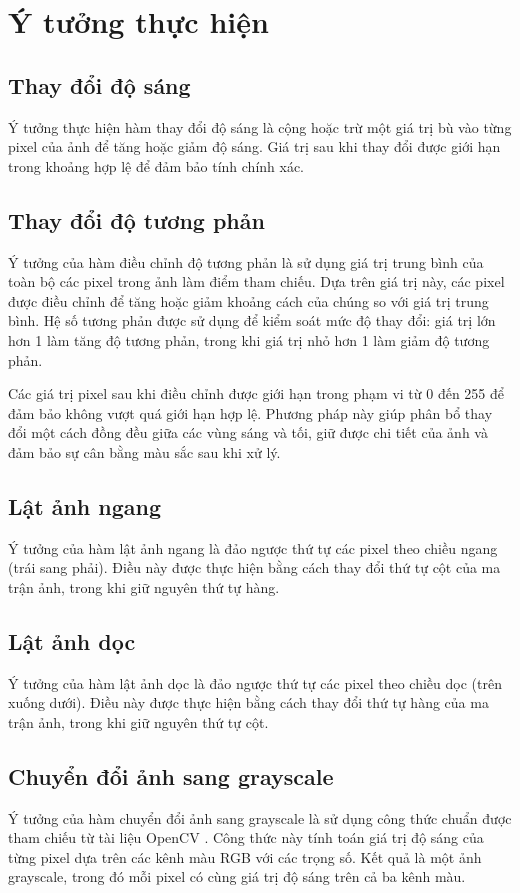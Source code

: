 \section{Ý tưởng thực hiện}
\subsection{Thay đổi độ sáng}
Ý tưởng thực hiện hàm thay đổi độ sáng là cộng hoặc trừ một giá trị bù vào từng pixel của ảnh để tăng hoặc giảm độ sáng. Giá trị sau khi thay đổi được giới hạn trong khoảng hợp lệ để đảm bảo tính chính xác.

\subsection{Thay đổi độ tương phản}
Ý tưởng của hàm điều chỉnh độ tương phản là sử dụng giá trị trung bình của toàn bộ các pixel trong ảnh làm điểm tham chiếu. Dựa trên giá trị này, các pixel được điều chỉnh để tăng hoặc giảm khoảng cách của chúng so với giá trị trung bình. Hệ số tương phản được sử dụng để kiểm soát mức độ thay đổi: giá trị lớn hơn 1 làm tăng độ tương phản, trong khi giá trị nhỏ hơn 1 làm giảm độ tương phản.

Các giá trị pixel sau khi điều chỉnh được giới hạn trong phạm vi từ 0 đến 255 để đảm bảo không vượt quá giới hạn hợp lệ. Phương pháp này giúp phân bổ thay đổi một cách đồng đều giữa các vùng sáng và tối, giữ được chi tiết của ảnh và đảm bảo sự cân bằng màu sắc sau khi xử lý.

\subsection{Lật ảnh ngang}
Ý tưởng của hàm lật ảnh ngang là đảo ngược thứ tự các pixel theo chiều ngang (trái sang phải). Điều này được thực hiện bằng cách thay đổi thứ tự cột của ma trận ảnh, trong khi giữ nguyên thứ tự hàng.

\subsection{Lật ảnh dọc}
Ý tưởng của hàm lật ảnh dọc là đảo ngược thứ tự các pixel theo chiều dọc (trên xuống dưới). Điều này được thực hiện bằng cách thay đổi thứ tự hàng của ma trận ảnh, trong khi giữ nguyên thứ tự cột.

\subsection{Chuyển đổi ảnh sang grayscale}
Ý tưởng của hàm chuyển đổi ảnh sang grayscale là sử dụng công thức chuẩn được tham chiếu từ tài liệu OpenCV \cite{opencv_color_conversions}. Công thức này tính toán giá trị độ sáng của từng pixel dựa trên các kênh màu RGB với các trọng số. Kết quả là một ảnh grayscale, trong đó mỗi pixel có cùng giá trị độ sáng trên cả ba kênh màu.


